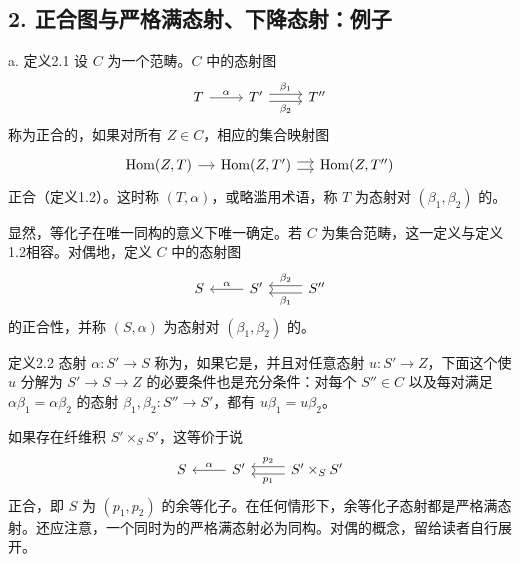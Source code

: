 \subsection*{2. 正合图与严格满态射、下降态射：例子}
\begin{statement}{a. 定义2.1}
设 $C$ 为一个范畴。$C$ 中的态射图
\[
\begin{tikzcd}
T\arrow[r,"\alpha"]&T'\arrow[r,shift left=.6ex,"\beta_1"]\arrow[r,shift right=.6ex,"\beta_2"']&T''
\end{tikzcd}
\]
称为正合的，如果对所有 $Z\in C$，相应的集合映射图
\[
\begin{tikzcd}[column sep=small]
\operatorname{Hom}(Z,T)\arrow[r]&\operatorname{Hom}(Z,T')\arrow[r,shift left=.6ex]\arrow[r,shift right=.6ex]&\operatorname{Hom}(Z,T'')
\end{tikzcd}
\]
正合（定义1.2）。这时称 $(T,\alpha)$，或略滥用术语，称 $T$ 为态射对 $(\beta_1,\beta_2)$ 的。
\end{statement}
显然，等化子在唯一同构的意义下唯一确定。若 $C$ 为集合范畴，这一定义与定义1.2相容。对偶地，定义 $C$ 中的态射图
\[
\begin{tikzcd}
S&S'\arrow[l,"\alpha"']&S''\arrow[l,shift left=.6ex,"\beta_1"]\arrow[l,shift right=.6ex,"\beta_2"']
\end{tikzcd}
\]
的正合性，并称 $(S,\alpha)$ 为态射对 $(\beta_1,\beta_2)$ 的。
\begin{statement}{定义2.2}
态射 $\alpha:S'\to S$ 称为，如果它是，并且对任意态射 $u:S'\to Z$，下面这个使 $u$ 分解为 $S'\to S\to Z$ 的必要条件也是充分条件：对每个 $S''\in C$ 以及每对满足 $\alpha\beta_1=\alpha\beta_2$ 的态射 $\beta_1,\beta_2:S''\to S'$，都有 $u\beta_1=u\beta_2$。
\end{statement}
如果存在纤维积 $S'\times_SS'$，这等价于说
\[
\begin{tikzcd}
S&S'\arrow[l,"\alpha"']&S'\times_SS'\arrow[l,shift left=.6ex,"p_1"]\arrow[l,shift right=.6ex,"p_2"']
\end{tikzcd}
\]
正合，即 $S$ 为 $(p_1,p_2)$ 的余等化子。在任何情形下，余等化子态射都是严格满态射。还应注意，一个同时为的严格满态射必为同构。对偶的概念，留给读者自行展开。

